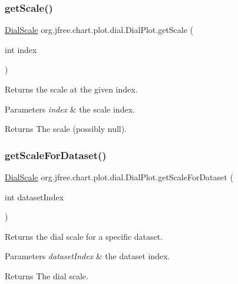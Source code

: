 \subsubsection{\texorpdfstring{get\+Scale()}{getScale()}}
{\footnotesize\ttfamily \mbox{\hyperlink{interfaceorg_1_1jfree_1_1chart_1_1plot_1_1dial_1_1_dial_scale}{Dial\+Scale}} org.\+jfree.\+chart.\+plot.\+dial.\+Dial\+Plot.\+get\+Scale (\begin{DoxyParamCaption}\item[{int}]{index }\end{DoxyParamCaption})}

Returns the scale at the given index.


\begin{DoxyParams}{Parameters}
{\em index} & the scale index.\\
\hline
\end{DoxyParams}
\begin{DoxyReturn}{Returns}
The scale (possibly {\ttfamily null}). 
\end{DoxyReturn}
\mbox{\label{classorg_1_1jfree_1_1chart_1_1plot_1_1dial_1_1_dial_plot_a7cd88f2ef804afaf946a477b47d57a42}} 
\subsubsection{\texorpdfstring{get\+Scale\+For\+Dataset()}{getScaleForDataset()}}
{\footnotesize\ttfamily \mbox{\hyperlink{interfaceorg_1_1jfree_1_1chart_1_1plot_1_1dial_1_1_dial_scale}{Dial\+Scale}} org.\+jfree.\+chart.\+plot.\+dial.\+Dial\+Plot.\+get\+Scale\+For\+Dataset (\begin{DoxyParamCaption}\item[{int}]{dataset\+Index }\end{DoxyParamCaption})}

Returns the dial scale for a specific dataset.


\begin{DoxyParams}{Parameters}
{\em dataset\+Index} & the dataset index.\\
\hline
\end{DoxyParams}
\begin{DoxyReturn}{Returns}
The dial scale. 
\end{DoxyReturn}
\mbox{\label{classorg_1_1jfree_1_1chart_1_1plot_1_1dial_1_1_dial_plot_aaf10cc454afc742c01aa1a6bb08bac18}} 
